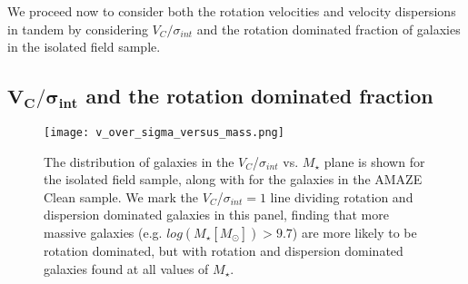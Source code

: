 \documentclass[fleqn,usenatbib]{mn2e}
\begin{document}
We proceed now to consider both the rotation velocities and velocity dispersions in tandem by considering $V_{C}/\sigma_{int}$ and the rotation dominated fraction of galaxies in the isolated field sample.


\subsection{$\boldsymbol{V_{C}/\sigma_{int}}$ and the rotation dominated fraction}\label{subsec:rdf_v_over_sigma}

\begin{figure}
    \centering \hspace{-1.13cm}
    \texttt{[image: v\_over\_sigma\_versus\_mass.png]}
    \caption{The distribution of galaxies in the $V_{C}$/$\sigma_{int}$ vs. $M_{\star}$ plane is shown for the isolated field sample, along with for the galaxies in the AMAZE Clean sample.
    We mark the $V_{C}$/$\sigma_{int}=1$ line dividing rotation and dispersion dominated galaxies in this panel, finding that more massive galaxies (e.g. $log(M_{\star}[M_{\odot}]) > 9.7$) are more likely to be rotation dominated, but with rotation and dispersion dominated galaxies found at all values of $M_{\star}$.}
    \label{fig:v_sig_and_v}
\end{figure}
\end{document}
